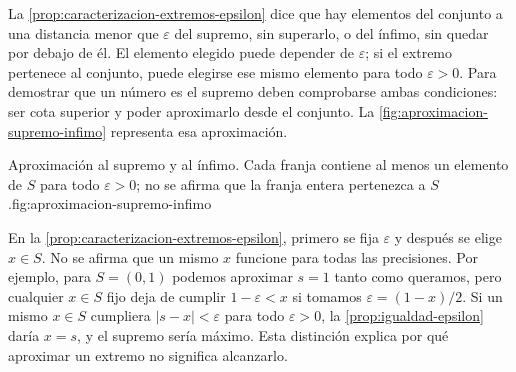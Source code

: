La \cref{prop:caracterizacion-extremos-epsilon} dice que hay elementos del conjunto a una distancia menor que $\varepsilon$ del supremo, sin superarlo, o del ínfimo, sin quedar por debajo de él. El elemento elegido puede depender de $\varepsilon$; si el extremo pertenece al conjunto, puede elegirse ese mismo elemento para todo $\varepsilon>0$. Para demostrar que un número es el supremo deben comprobarse ambas condiciones: ser cota superior y poder aproximarlo desde el conjunto. La \cref{fig:aproximacion-supremo-infimo} representa esa aproximación.

\begin{figuranotas}{Aproximación al supremo y al ínfimo. Cada franja contiene al menos un elemento de $S$ para todo $\varepsilon>0$; no se afirma que la franja entera pertenezca a $S$.}{fig:aproximacion-supremo-infimo}

\end{figuranotas}

\begin{remark}
En la \cref{prop:caracterizacion-extremos-epsilon}, primero se fija $\varepsilon$ y después se elige $x\in S$. No se afirma que un mismo $x$ funcione para todas las precisiones. Por ejemplo, para $S=(0,1)$ podemos aproximar $s=1$ tanto como queramos, pero cualquier $x\in S$ fijo deja de cumplir $1-\varepsilon<x$ si tomamos $\varepsilon=(1-x)/2$. Si un mismo $x\in S$ cumpliera $|s-x|<\varepsilon$ para todo $\varepsilon>0$, la \cref{prop:igualdad-epsilon} daría $x=s$, y el supremo sería máximo. Esta distinción explica por qué aproximar un extremo no significa alcanzarlo.
\end{remark}

